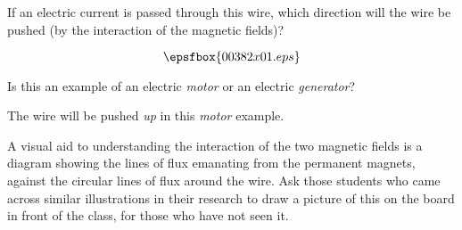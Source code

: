 

If an electric current is passed through this wire, which direction will the wire be pushed (by the interaction of the magnetic fields)?

$$\epsfbox{00382x01.eps}$$

Is this an example of an electric {\it motor} or an electric {\it generator}?







The wire will be pushed {\it up} in this {\it motor} example.







A visual aid to understanding the interaction of the two magnetic fields is a diagram showing the lines of flux emanating from the permanent magnets, against the circular lines of flux around the wire.  Ask those students who came across similar illustrations in their research to draw a picture of this on the board in front of the class, for those who have not seen it.




